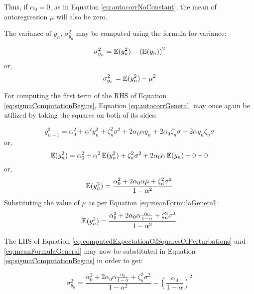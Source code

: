 Thus, if $\alpha_0 = 0$, as in Equation \ref{eq:autocorrNoConstant}, the mean of autoregression $\mu$ will also be zero.

The variance of $y_{n}$, $\sigma^2_{y_{n}}$ may be computed using the formula for variance:

\begin{equation}
	\sigma^2_{y_{n}} = \EX(y^2_{n}) - \left(\EX(y_{n})\right)^2
\end{equation} 	
\hspace{25pt} or,
\begin{equation}
	\label{eq:sigmaComputationBegins}
	\sigma^2_{y_{n}} = \EX(y^2_{n}) - \mu^2
\end{equation}

For computing the first term of the RHS of Equation \ref{eq:sigmaComputationBegins}, Equation \ref{eq:autocorrGeneral} may once again be utilized by taking the squares on both of its sides:

\begin{equation}
	y^2_{n+1} = \alpha^2_0 + \alpha^2 y^2_{n} + \zeta^2_n \sigma^2 + 2\alpha_0 \alpha y_{n} + 2\alpha_0 \zeta_n \sigma + 2\alpha y_{n} \zeta_n \sigma
\end{equation}
\hspace{25pt} or,
\begin{equation}
	\EX(y^2_{n}) = \alpha^2_0 + \alpha^2 \EX(y^2_{n}) + \zeta^2_{n} \sigma^2 + 2\alpha_0\alpha\EX(y_{n}) + 0 + 0
\end{equation}
\hspace{25pt} or,
\begin{equation}
	\EX(y^2_{n}) = \frac{\alpha^2_{0} + 2\alpha_0\alpha\mu + \zeta^2_{n}\sigma^2}{1-\alpha^2}
\end{equation}
Substituting the value of $\mu$ as per Equation \ref{eq:meanFormulaGeneral}:
\begin{equation}
	\label{eq:computedExpectationOfSquaresOfPerturbations}
	\EX(y^2_{n}) = \frac{\alpha^2_{0} + 2\alpha_0\alpha\frac{\alpha_0}{1-\alpha} + \zeta^2_{n}\sigma^2}{1-\alpha^2}
\end{equation}

 The LHS of Equation \ref{eq:computedExpectationOfSquaresOfPerturbations} and \ref{eq:meanFormulaGeneral} may now be substituted in Equation \ref{eq:sigmaComputationBegins} in order to get:
 
 \begin{equation}
 	\sigma^2_{y_{n}} = \frac{\alpha^2_{0} + 2\alpha_0\alpha\frac{\alpha_0}{1-\alpha} + \zeta^2_{n}\sigma^2}{1-\alpha^2} - \left(\frac{\alpha_0}{1-\alpha}\right)^2
 \end{equation}

